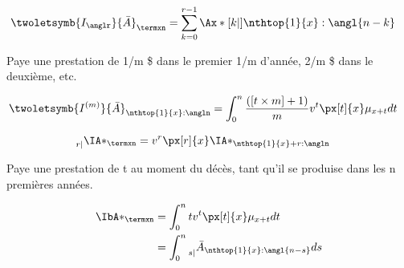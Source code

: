 \documentclass[10pt, french]{article}
\begin{document}
\begin{multicols*}{3}
\begin{definitionNOHFILLprop}
\begin{center}

\end{center}
\end{definitionNOHFILLprop}


\begin{definitionNOHFILLprop}
\begin{align*}
	\twoletsymb{I_{\anglr}}{\bar{A}}_{\termxn} 
		&= \sum_{k = 0}^{r - 1} \Ax*[k|]{\nthtop{1}{x}:\angl{n - k}} 
\end{align*}
\end{definitionNOHFILLprop}


\begin{definitionNOHFILLprop}
Paye une prestation de 1/m \$ dans le premier 1/m d'année, 2/m \$ dans le deuxième, etc.

\begin{align*}
	\twoletsymb{I^{(m)}}{\bar{A}}_{\nthtop{1}{x}:\angln} 
	&= \int_0^n \frac{([t \times m] + 1)}{m} v^t \px[t]{x} \mu_{x + t} dt 
\end{align*}
\end{definitionNOHFILLprop}


\begin{definitionNOHFILLprop}
\begin{align*}
	\prescript{}{r|}{\IA*_{\termxn}} 
	&= v^{r}\px[r]{x}\IA*_{\nthtop{1}{x} + r:\angln}
\end{align*}
\end{definitionNOHFILLprop}


\begin{definitionNOHFILLprop}
Paye une prestation de t au moment du décès, tant qu'il se produise dans les n premières années.

\begin{align*}
	\IbA*_{\termxn} 
	&=  \int_0^n t v^t \px[t]{x} \mu_{x + t} dt \\
	&= 	\int_0^n \prescript{}{s|}{\bar{A}_{\nthtop{1}{x}:\angl{n - s}}} ds
\end{align*}
\end{definitionNOHFILLprop}




\end{multicols*}
\end{document}
